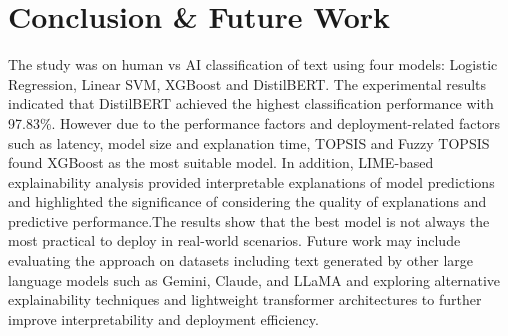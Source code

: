 \documentclass[conference]{IEEEtran}
\begin{document}
\section{Conclusion \& Future Work}
The study was on human vs AI classification of text using four models: Logistic Regression, Linear SVM, XGBoost and DistilBERT. The experimental results indicated that DistilBERT achieved the highest classification performance with 97.83\%. However due to the performance factors and deployment-related factors such as latency, model size and explanation time, TOPSIS and Fuzzy TOPSIS found XGBoost as the most suitable model. In addition, LIME-based explainability analysis provided interpretable explanations of model predictions and highlighted the significance of considering the quality of explanations and predictive performance.The results show that the best model is not always the most practical to deploy in real-world scenarios. Future work may include evaluating the approach on datasets including text generated by other large language models such as Gemini, Claude, and LLaMA and exploring alternative explainability techniques and lightweight transformer architectures to further improve interpretability and deployment efficiency.
\end{document}
